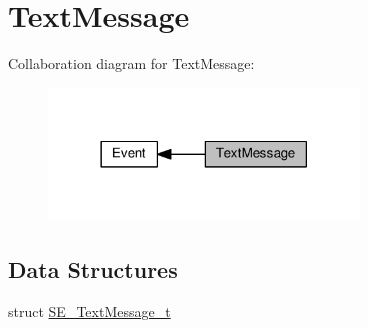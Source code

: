 \hypertarget{group__TextMessage}{}\section{Text\+Message}
\label{group__TextMessage}
Collaboration diagram for Text\+Message\+:\nopagebreak
\begin{figure}[H]
\begin{center}
\leavevmode
\includegraphics[width=234pt]{group__TextMessage}
\end{center}
\end{figure}
\subsection*{Data Structures}
\begin{DoxyCompactItemize}
\item 
struct \hyperlink{structSE__TextMessage__t}{S\+E\+\_\+\+Text\+Message\+\_\+t}
\end{DoxyCompactItemize}
